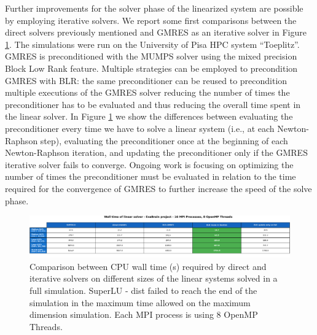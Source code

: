 \documentclass[a4paper,12pt]{article}
\begin{document}
Further improvements for the solver phase of the linearized system are possible by employing iterative solvers. We report some first comparisons between the direct solvers previously mentioned and GMRES as an iterative solver in Figure \ref{fig:fau-wall-times}. The simulations were run on the University of Pisa HPC system “Toeplitz”. GMRES is preconditioned with the MUMPS solver using the mixed precision Block Low Rank feature. Multiple strategies can be employed to precondition GMRES with BLR: the same preconditioner can be reused to precondition multiple executions of the GMRES solver reducing the number of times the preconditioner has to be evaluated and thus reducing the overall time spent in the linear solver. In Figure \ref{fig:fau-wall-times} we show the differences between evaluating the preconditioner every time we have to solve a linear system (i.e., at each Newton-Raphson step), evaluating the preconditioner once at the beginning of each Newton-Raphson iteration, and updating the preconditioner only if the GMRES iterative solver fails to converge. Ongoing work is focusing on optimizing the number of times the preconditioner must be evaluated in relation to the time required for the convergence of GMRES to further increase the speed of the solve phase.

\begin{figure}
  \centering

  \includegraphics[width=\textwidth]{fau-wall-times.png}

  \caption{Comparison between CPU wall time (s) required by direct and iterative solvers on different sizes of the linear systems solved in a full simulation. SuperLU - dist failed to reach the end of the simulation in the maximum time allowed on the maximum dimension simulation. Each MPI process is using 8 OpenMP Threads.}
  \label{fig:fau-wall-times}
\end{figure}
\end{document}
